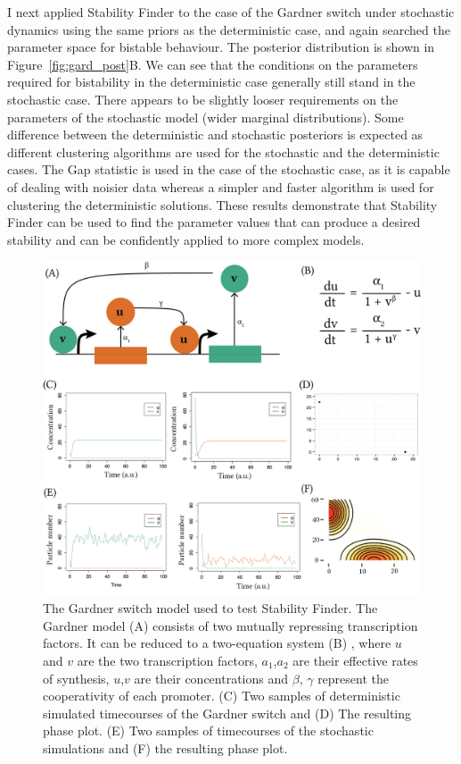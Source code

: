 I next applied Stability Finder to the case of the Gardner switch under stochastic dynamics using the same priors as the deterministic case, and again searched the parameter space for bistable behaviour. The posterior distribution is shown in Figure~\ref{fig:gard_post}B. We can see that the conditions on the parameters required for bistability in the deterministic case generally still stand in the stochastic case. There appears to be slightly looser requirements on the parameters of the stochastic model (wider marginal distributions). Some difference between the deterministic and stochastic posteriors is expected as different clustering algorithms are used for the stochastic and the deterministic cases. The Gap statistic is used in the case of the stochastic case, as it is capable of dealing with noisier data whereas a simpler and faster algorithm is used for clustering the deterministic solutions. These results demonstrate that Stability Finder can be used to find the parameter values that can produce a desired stability and can be confidently applied to more complex models.


\begin{figure}[htbp]
\begin{center}
	\includegraphics[scale=0.8]{../../chapters/chapterStabilityFinder/images/gardner_model.png}
	\caption[LoF caption]{\label{fig:gard_mod} The Gardner switch model used to test Stability Finder. The Gardner model (A) consists of two mutually repressing transcription factors. It can be reduced to a two-equation system (B) , where $u$ and $v$ are the two transcription factors, $a_1$,$a_2$ are their effective rates of synthesis, $u$,$v$ are their concentrations and $\beta$, $\gamma$ represent the cooperativity of each promoter. (C) Two samples of deterministic simulated timecourses of the Gardner switch and (D) The resulting phase plot. (E) Two samples of timecourses of the stochastic simulations and (F) the resulting phase plot.}
\end{center}
\end{figure}


